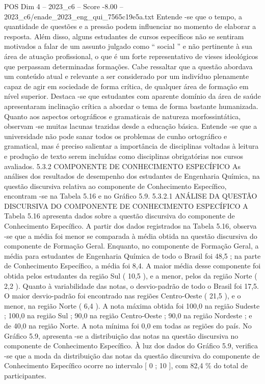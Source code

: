 \begin{textsample}{POS Dim 4 – 2023\_c6 – Score -8.00 – 2023\_c6/enade\_2023\_eng\_qui\_7565c19e5a.txt}
Entende -se que o tempo, a quantidade de questões e a pressão podem influenciar no momento de elaborar a resposta.
Além disso, alguns estudantes de cursos específicos não se sentiram motivados a falar de um assunto julgado como “ social ” e não pertinente à sua área de atuação profissional, o que é um forte representativo de vieses ideológicos que perpassam determinadas formações.
Cabe ressaltar que a questão abordava um conteúdo atual e relevante a ser considerado por um indivíduo plenamente capaz de agir em sociedade de forma crítica, de qualquer área de formação em nível superior.
Destaca -se que estudantes com aparente domínio da área de saúde apresentaram inclinação crítica a abordar o tema de forma bastante humanizada.
Quanto aos aspectos ortográficos e gramaticais de natureza morfossintática, observam -se muitas lacunas trazidas desde a educação básica.
Entende -se que a universidade não pode sanar todos os problemas de cunho ortográfico e gramatical, mas é preciso salientar a importância de disciplinas voltadas à leitura e produção de texto serem incluídas como disciplinas obrigatórias nos cursos avaliados. 5.3.2 COMPONENTE DE CONHECIMENTO ESPECÍFICO As análises dos resultados de desempenho dos estudantes de Engenharia Química, na questão discursiva relativa ao componente de Conhecimento Específico, encontram -se na Tabela 5.16 e no Gráfico 5.9. 5.3.2.1 ANÁLISE DA QUESTÃO DISCURSIVA DO COMPONENTE DE CONHECIMENTO ESPECÍFICO A Tabela 5.16 apresenta dados sobre a questão discursiva do componente de Conhecimento Específico.
A partir dos dados registrados na Tabela 5.16, observa -se que a média foi menor se comparada à média obtida na questão discursiva do componente de Formação Geral.
Enquanto, no componente de Formação Geral, a média para estudantes de Engenharia Química de todo o Brasil foi 48,5 ; na parte de Conhecimento Específico, a média foi 8,4.
A maior média desse componente foi obtida pelos estudantes da região Sul ( 10,5 ), e a menor, pelos da região Norte ( 2,2 ).
Quanto à variabilidade das notas, o desvio-padrão de todo o Brasil foi 17,5.
O maior desvio-padrão foi encontrado nas regiões Centro-Oeste ( 21,5 ), e o menor, na região Norte ( 6,4 ).
A nota máxima obtida foi 100,0 na região Sudeste ; 100,0 na região Sul ; 90,0 na região Centro-Oeste ; 90,0 na região Nordeste ; e de 40,0 na região Norte.
A nota mínima foi 0,0 em todas as regiões do país.
No Gráfico 5.9, apresenta -se a distribuição das notas na questão discursiva no componente de Conhecimento Específico.
À luz dos dados do Gráfico 5.9, verifica -se que a moda da distribuição das notas da questão discursiva do componente de Conhecimento Específico ocorre no intervalo [ 0 ; 10 ], com 82,4 \% do total de participantes.

\end{textsample}
